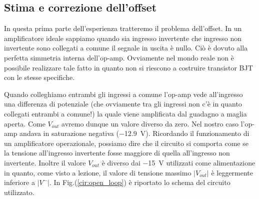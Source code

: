 \subsection{Stima e correzione dell'offset}
\label{par2:offset}

In questa prima parte dell'esperienza tratteremo il problema dell'offset. In un amplificatore ideale sappiamo quando sia ingresso invertente che ingresso non invertente sono collegati a comune il segnale in uscita è nullo. Ciò è dovuto alla perfetta simmetria interna dell'op-amp. Ovviamente nel mondo reale non è possibile realizzare tale fatto in quanto non si riescono a costruire transistor BJT con le stesse specifiche. 

Quando colleghiamo entrambi gli ingressi a comune l'op-amp vede all'ingresso una differenza di potenziale (che ovviamente tra gli ingressi non c'è in quanto collegati entrambi a comune!) la quale viene amplificata dal guadagno a maglia aperta. Come $V_{out}$ avremo dunque un valore diverso da zero. Nel nostro caso l'op-amp andava in saturazione negativa (\SI{-12.9}{\volt}). Ricordando il funzionamento di un amplificatore operazionale, possiamo dire che il circuito si comporta come se la tensione all'ingresso invertente fosse maggiore di quella all'ingresso non invertente. Inoltre il valore $V_{out}$ è diverso dai \SI{-15}{\volt} utilizzati come alimentazione in quanto, come visto a lezione, il valore di tensione massimo $|V_{out}|$ è leggermente inferiore a $|V^-|$. In Fig.(\ref{cir:open_loop}) è riportato lo schema del circuito utilizzato.

